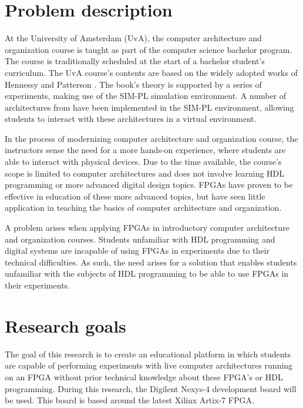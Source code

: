 \documentclass[singleside,openright]{uva-bachelor-thesis}
\begin{document}
\section{Problem description}
At the University of Amsterdam (UvA), the computer architecture and organization course is taught as part of  the computer science bachelor program. The course is traditionally scheduled at the start of a bachelor student's curriculum. The UvA course's contents are based on the widely adopted works of Hennessy and Patterson \cite{hennessyPatterson}. The book's theory is supported by a series of experiments, making use of the SIM-PL \cite{simpl} simulation environment. A number of architectures from \cite{hennessyPatterson} have been implemented in the SIM-PL environment, allowing students to interact with these architectures in a virtual environment. 

In the process of modernizing computer architecture and organization course, the instructors sense the need for a more hands-on experience, where students are able to interact with physical devices. Due to the time available, the course's scope is limited to computer architectures and does not involve learning HDL programming or more advanced digital design topics. FPGAs have proven to be effective in education of these more advanced topics, but have seen little application in teaching the basics of computer architecture and organization. 

A problem arises when applying FPGAs in introductory computer architecture and organization courses. Students unfamiliar with HDL programming and digital systems are incapable of using FPGAs in experiments due to their technical difficulties. As such, the need arises for a solution that enables students unfamiliar with the subjects of HDL programming to be able to use FPGAs in their experiments. 

\section{Research goals}
The goal of this research is to create an educational platform in which students are capable of performing  experiments with live computer architectures running on an FPGA without prior technical knowledge about these FPGA's or HDL programming. During this research, the Digilent Nexys-4 development board will be used. This board is based around the latest Xilinx Artix-7 FPGA. 
\end{document}
